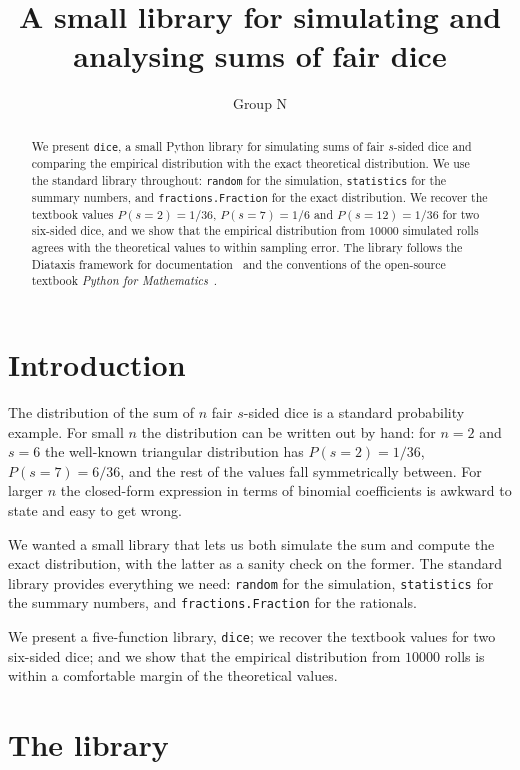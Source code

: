 \documentclass[11pt]{article}
\title{A small library for simulating and analysing sums of fair dice}
\author{Group N}
\date{}
\begin{document}
\maketitle

\begin{abstract}
We present \texttt{dice}, a small Python library for simulating sums
of fair \(s\)-sided dice and comparing the empirical distribution
with the exact theoretical distribution. We use the standard library
throughout: \texttt{random} for the simulation, \texttt{statistics}
for the summary numbers, and \texttt{fractions.Fraction} for the
exact distribution. We recover the textbook values
\(P(s = 2) = 1/36\), \(P(s = 7) = 1/6\) and \(P(s = 12) = 1/36\) for
two six-sided dice, and we show that the empirical distribution from
\(10000\) simulated rolls agrees with the theoretical values to
within sampling error. The library follows the Diataxis framework for
documentation~\cite{procida2017} and the conventions of the
open-source textbook \emph{Python for
Mathematics}~\cite{knight2024}.
\end{abstract}

\section{Introduction}

The distribution of the sum of \(n\) fair \(s\)-sided dice is a
standard probability example. For small \(n\) the distribution can be
written out by hand: for \(n = 2\) and \(s = 6\) the well-known
triangular distribution has \(P(s = 2) = 1/36\), \(P(s = 7) = 6/36\),
and the rest of the values fall symmetrically between. For larger
\(n\) the closed-form expression in terms of binomial coefficients is
awkward to state and easy to get wrong.

We wanted a small library that lets us both simulate the sum and
compute the exact distribution, with the latter as a sanity check on
the former. The standard library provides everything we need:
\texttt{random} for the simulation, \texttt{statistics} for the
summary numbers, and \texttt{fractions.Fraction} for the rationals.

We present a five-function library,
\texttt{dice}; we recover the textbook values for two six-sided dice;
and we show that the empirical distribution from \(10000\) rolls is
within a comfortable margin of the theoretical values.

\section{The library}
\end{document}
